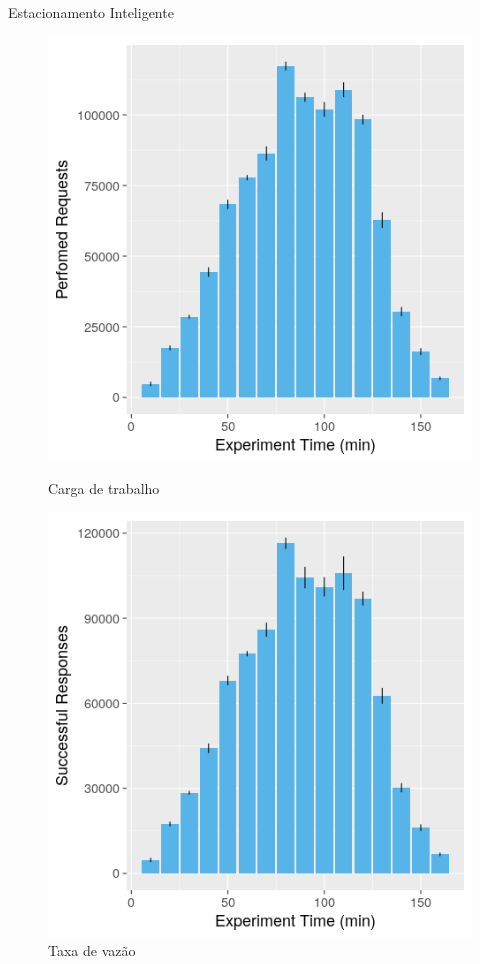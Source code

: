 \documentclass[xcolor={usenames,svgnames,dvipsnames},brazil,english,12pt,aspectratio=149]{beamer}
\begin{document}
\begin{frame}{Estacionamento Inteligente}
     \begin{figure}[ht]
        \begin{minipage}[b]{0.45\linewidth}
            \centering
            \includegraphics[width=\textwidth]{workload.png}
            \caption{Carga de trabalho}
        \end{minipage}
        \hspace{0.5cm}
        \begin{minipage}[b]{0.45\linewidth}
            \centering
            \includegraphics[width=\textwidth]{throughput.png}
            \caption{Taxa de vazão}
        \end{minipage}
    \end{figure}
\end{frame}
\end{document}
